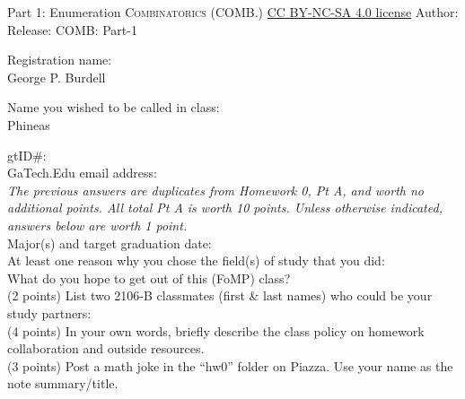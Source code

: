 \newpage\handout
{Part 1: Enumeration}
{\textsc{Combinatorics (COMB.)}}
{\href{https://creativecommons.org/licenses/by-nc-sa/4.0/}{CC BY-NC-SA 4.0 license}}
{Author: \HandoutAuthor}{Release: \generatedOn}
{COMB: Part-1}

\newpage







\bigskip
\bigskip


\noindent Registration name: \\
George P. Burdell
\bigskip

\noindent Name you wished to be called in class: \\
Phineas
\bigskip

\noindent gtID\#: \\

\noindent GaTech.Edu email address: \\

\noindent
\textit{The previous answers are duplicates from Homework 0, Pt A, and 
worth no additional points. 
All total Pt A is worth 10 points.
Unless otherwise indicated, answers below are worth 1 point.} \\


\noindent Major(s) and target graduation date: \\


\noindent At least one reason why you chose the field(s) of study that you did: \\

\noindent What do you hope to get out of this (FoMP) class?  \\

\noindent (2 points) List two 2106-B classmates (first \& last names) 
who could be your study partners: \\

\noindent (4 points) In your own words, briefly describe the class 
policy on homework collaboration and outside resources.  \\

\noindent (3 points) Post a math joke in the ``hw0'' folder on Piazza.
Use your name as the note summary/title. \\

